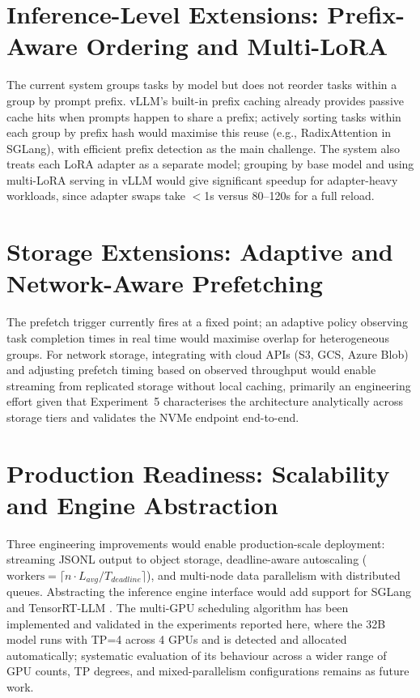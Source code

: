 \documentclass[logo,bsc,singlespacing,parskip,online]{infthesis}
\begin{document}
\section{Inference-Level Extensions: Prefix-Aware Ordering and Multi-LoRA}

The current system groups tasks by model but does not reorder tasks within a group by prompt prefix. vLLM's built-in prefix caching already provides passive cache hits when prompts happen to share a prefix; actively sorting tasks within each group by prefix hash would maximise this reuse (e.g., RadixAttention in SGLang), with efficient prefix detection as the main challenge. The system also treats each LoRA adapter as a separate model; grouping by base model and using multi-LoRA serving in vLLM \citep{sheng2024slora} would give significant speedup for adapter-heavy workloads, since adapter swaps take $<$1s versus 80--120s for a full reload.

\section{Storage Extensions: Adaptive and Network-Aware Prefetching}

The prefetch trigger currently fires at a fixed point; an adaptive policy observing task completion times in real time would maximise overlap for heterogeneous groups. For network storage, integrating with cloud APIs (S3, GCS, Azure Blob) and adjusting prefetch timing based on observed throughput would enable streaming from replicated storage without local caching, primarily an engineering effort given that Experiment~5 characterises the architecture analytically across storage tiers and validates the NVMe endpoint end-to-end.

\section{Production Readiness: Scalability and Engine Abstraction}

Three engineering improvements would enable production-scale deployment: streaming JSONL output to object storage, deadline-aware autoscaling ($\text{workers} = \lceil n \cdot L_{avg} / T_{deadline} \rceil$), and multi-node data parallelism with distributed queues. Abstracting the inference engine interface would add support for SGLang \citep{zheng2024sglang} and TensorRT-LLM \citep{tensorrt_llm2024}. The multi-GPU scheduling algorithm has been implemented and validated in the experiments reported here, where the 32B model runs with TP=4 across 4 GPUs and is detected and allocated automatically; systematic evaluation of its behaviour across a wider range of GPU counts, TP degrees, and mixed-parallelism configurations remains as future work.
\end{document}
